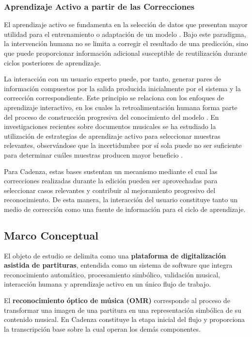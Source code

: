 \documentclass[conference]{IEEEtran}
\begin{document}
\subsubsection{Aprendizaje Activo a partir de las Correcciones}

El aprendizaje activo se fundamenta en la selección de datos que presentan
mayor utilidad para el entrenamiento o adaptación de un modelo
\cite{settles2009}. Bajo este paradigma, la intervención humana no se limita
a corregir el resultado de una predicción, sino que puede proporcionar
información adicional susceptible de reutilización durante ciclos
posteriores de aprendizaje.

La interacción con un usuario experto puede, por tanto, generar pares de
información compuestos por la salida producida inicialmente por el sistema y
la corrección correspondiente. Este principio se relaciona con los enfoques
de aprendizaje interactivo, en los cuales la retroalimentación humana forma
parte del proceso de construcción progresiva del conocimiento del modelo
\cite{amershi2014}. En investigaciones recientes sobre documentos musicales
se ha estudiado la utilización de estrategias de aprendizaje activo para
seleccionar muestras relevantes, observándose que la incertidumbre por sí
sola puede no ser suficiente para determinar cuáles muestras producen mayor
beneficio \cite{mlsp2025}.

Para Cadenza, estas bases sustentan un mecanismo mediante el cual las
correcciones realizadas durante la edición pueden ser aprovechadas para
seleccionar casos relevantes y contribuir al mejoramiento progresivo del
reconocimiento. De esta manera, la interacción del usuario constituye tanto
un medio de corrección como una fuente de información para el ciclo de
aprendizaje.

\subsection{Marco Conceptual}

El objeto de estudio se delimita como una \textbf{plataforma de
digitalización asistida de partituras}, entendida como un sistema de
software que integra reconocimiento automático, procesamiento simbólico,
validación musical, interacción humana y aprendizaje activo en un único
flujo de trabajo.

El \textbf{reconocimiento óptico de música (OMR)} corresponde al proceso de
transformar una imagen de una partitura en una representación simbólica de
su contenido musical. En Cadenza constituye la etapa inicial del flujo y
proporciona la transcripción base sobre la cual operan los demás componentes.
\end{document}
